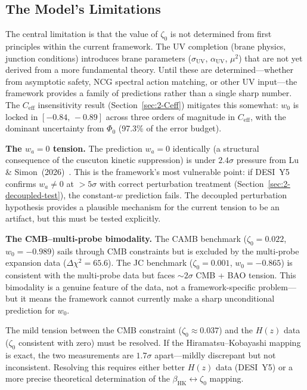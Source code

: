 \subsection{The Model's Limitations}
\label{sec:2-weakness}

The central limitation is that the value of $\zeta_0$ is not determined from first principles within the current framework. The UV completion (brane physics, junction conditions) introduces brane parameters ($\sigma_\mathrm{UV}$, $\alpha_\mathrm{UV}$, $\mu^2$) that are not yet derived from a more fundamental theory. Until these are determined---whether from asymptotic safety, NCG spectral action matching, or other UV input---the framework provides a family of predictions rather than a single sharp number. The $C_\mathrm{eff}$ insensitivity result (Section~\ref{sec:2-Ceff}) mitigates this somewhat: $w_0$ is locked in $[-0.84,\, -0.89]$ across three orders of magnitude in $C_\mathrm{eff}$, with the dominant uncertainty from $\Phi_0$ (97.3\% of the error budget).

\textbf{The $w_a = 0$ tension.} The prediction $w_a = 0$ identically (a structural consequence of the cuscuton kinetic suppression) is under $2.4\sigma$ pressure from Lu \& Simon~(2026)~\cite{ch2:LuSimon2026}. This is the framework's most vulnerable point: if DESI~Y5 confirms $w_a \neq 0$ at $> 5\sigma$ with correct perturbation treatment (Section~\ref{sec:2-decoupled-test}), the constant-$w$ prediction fails. The decoupled perturbation hypothesis provides a plausible mechanism for the current tension to be an artifact, but this must be tested explicitly.

\textbf{The CMB--multi-probe bimodality.} The CAMB benchmark ($\zeta_0 = 0.022$, $w_0 = -0.989$) sails through CMB constraints but is excluded by the multi-probe expansion data ($\Delta\chi^2 = 65.6$). The JC benchmark ($\zeta_0 = 0.001$, $w_0 = -0.865$) is consistent with the multi-probe data but faces ${\sim}2\sigma$ CMB + BAO tension. This bimodality is a genuine feature of the data, not a framework-specific problem---but it means the framework cannot currently make a sharp unconditional prediction for $w_0$.

The mild tension between the CMB constraint ($\zeta_0 \approx 0.037$) and the $H(z)$ data ($\zeta_0$ consistent with zero) must be resolved. If the Hiramatsu--Kobayashi mapping is exact, the two measurements are $1.7\sigma$ apart---mildly discrepant but not inconsistent. Resolving this requires either better $H(z)$ data (DESI~Y5) or a more precise theoretical determination of the $\beta_\mathrm{HK} \leftrightarrow \zeta_0$ mapping.


